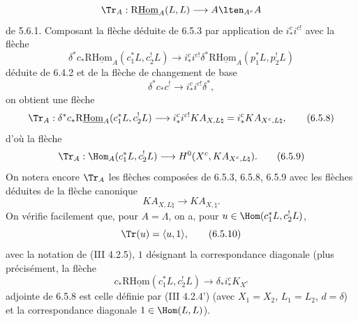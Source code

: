 \[
\Tr_A:\mathrm{R}\underline{\mathrm{Hom}}_A(L,L)\longrightarrow A\lten_{A^e}A
\]
de 5.6.1. Composant la flèche déduite de 6.5.3 par application de $i_*^ci^{c!}$ avec la flèche
\begin{equation}
\delta^*c_*\mathrm{R}\underline{\mathrm{Hom}}_A(c_1^*L,c_2^!L)
\longrightarrow
i_*^ci^{c!}\delta^*\mathrm{R}\underline{\mathrm{Hom}}_A(p_1^*L,p_2^!L)
\tag{6.5.7}
\end{equation}
déduite de 6.4.2 et de la flèche de changement de base
\[
\delta^*c_*c^!\longrightarrow i_*^ci^{c!}\delta^*,
\]
on obtient une flèche
\begin{equation}
\Tr_A:\delta^*c_*\mathrm{R}\underline{\mathrm{Hom}}_A(c_1^*L,c_2^!L)
\longrightarrow
i_*^ci^{c!}KA_{X,L\natural}
=i_*^cKA_{X^c,L\natural},
\tag{6.5.8}
\end{equation}
d'où la flèche
\begin{equation}
\Tr_A:\Hom_A(c_1^*L,c_2^!L)
\longrightarrow
H^0(X^c,KA_{X^c,L\natural}).
\tag{6.5.9}
\end{equation}
On notera encore $\Tr_A$ les flèches composées de 6.5.3, 6.5.8, 6.5.9 avec les flèches déduites de la flèche canonique
\[
KA_{X,L\natural}\longrightarrow KA_{X,\natural}.
\]
On vérifie facilement que, pour $A=\Lambda$, on a, pour $u\in\Hom(c_1^*L,c_2^!L)$,
\begin{equation}
\Tr(u)=\langle u,1\rangle,
\tag{6.5.10}
\end{equation}
avec la notation de (III 4.2.5), $1$ désignant la correspondance diagonale (plus précisément, la flèche
\[
c_*\mathrm{R}\underline{\mathrm{Hom}}(c_1^*L,c_2^!L)\longrightarrow \delta_*i_*^cK_{X^c}
\]
adjointe de 6.5.8 est celle définie par (III 4.2.4') (avec $X_1=X_2$, $L_1=L_2$, $d=\delta$) et la correspondance diagonale $1\in\Hom(L,L)$).

